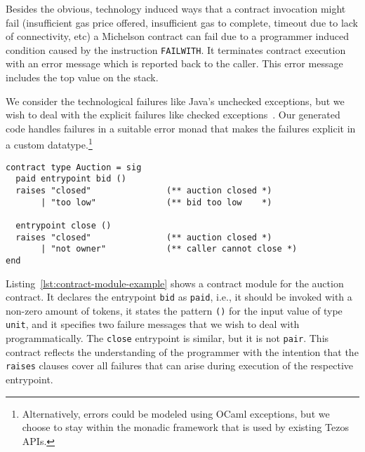 \documentclass[a4paper,USenglish,american,cleveref, autoref, thm-restate]{oasics-v2021}
\begin{document}
Besides the obvious, technology induced ways that a contract invocation might fail
(insufficient gas price offered, insufficient gas to complete, timeout
due to lack of connectivity, etc) a Michelson contract can fail due to
a programmer induced condition caused by the
instruction \lstinline/FAILWITH/. It terminates contract execution
with an error message which is reported back to the caller. This error
message includes the top value on the stack.

We consider the technological failures like Java's unchecked
exceptions, but we wish to deal with the explicit failures like
checked exceptions~\cite{DBLP:conf/oopsla/AnconaLZ01}.
Our generated code handles failures in a suitable
error monad that makes the failures explicit in a custom
datatype.\footnote{Alternatively, errors could be modeled using OCaml
  exceptions, but we choose to stay within the monadic framework that
  is used by existing Tezos APIs.}

\begin{lstlisting}[float,captionpos=b,caption={Example contract module},label={lst:contract-module-example}]
contract type Auction = sig
  paid entrypoint bid () 
  raises "closed"               (** auction closed *)
       | "too low"              (** bid too low    *)

  entrypoint close ()
  raises "closed"               (** auction closed *)
       | "not owner"            (** caller cannot close *)
end
\end{lstlisting}
Listing~\ref{lst:contract-module-example} shows a contract module for
the auction contract.  It declares the entrypoint \lstinline/bid/ as
\lstinline/paid/, i.e., it should be invoked with a
non-zero amount of tokens, it states the pattern \lstinline/()/ for the
input value of type \lstinline/unit/, and it specifies two 
failure messages that we wish to deal with programmatically.
The \lstinline/close/ entrypoint is similar, but it is not
\lstinline/pair/. This contract reflects the understanding of the
programmer with the intention that the \lstinline/raises/ clauses
cover all failures that can arise during execution of the respective
entrypoint. 
\end{document}
